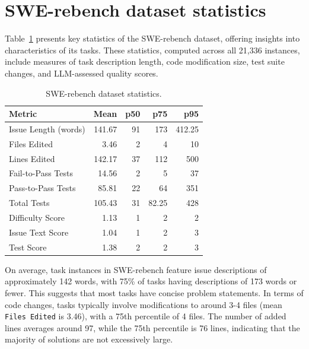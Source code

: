 \documentclass[dandb]{article}
\begin{document}
\section{SWE-rebench dataset statistics}
\label{sec:dataset_statistics}

Table~\ref{tab:dataset_stats_transposed} presents key statistics of the SWE-rebench dataset, offering insights into characteristics of its tasks. These statistics, computed across all 21,336 instances, include measures of task description length, code modification size, test suite changes, and LLM-assessed quality scores.

\begin{table}[htbp]
  \centering
  \caption{SWE-rebench dataset statistics.}
  \label{tab:dataset_stats_transposed}
  \begin{tabular}{lrrrr}
    \toprule
    Metric             & Mean      & p50 & p75    & p95    \\
    \midrule
    Issue Length (words) & 141.67  & 91           & 173    & 412.25 \\
    Files Edited       & 3.46    & 2            & 4      & 10     \\
    Lines Edited       & 142.17  & 37           & 112    & 500    \\
    Fail-to-Pass Tests & 14.56   & 2            & 5      & 37     \\
    Pass-to-Pass Tests & 85.81   & 22           & 64     & 351    \\
    Total Tests        & 105.43  & 31           & 82.25  & 428    \\
    Difficulty Score   & 1.13    & 1            & 2      & 2      \\
    Issue Text Score   & 1.04    & 1            & 2      & 3      \\
    Test Score         & 1.38    & 2            & 2      & 3      \\
    \bottomrule
  \end{tabular}
\end{table}

On average, task instances in SWE-rebench feature issue descriptions of approximately 142 words, with 75\% of tasks having descriptions of 173 words or fewer. This suggests that most tasks have concise problem statements. In terms of code changes, tasks typically involve modifications to around 3-4 files (mean \texttt{Files Edited} is 3.46), with a 75th percentile of 4 files. The number of added lines averages around 97, while the 75th percentile is 76 lines, indicating that the majority of solutions are not excessively large.
\end{document}
